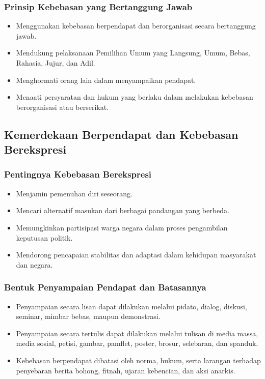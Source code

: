 \subsubsection{Prinsip Kebebasan yang Bertanggung Jawab}
\begin{itemize}
\item Menggunakan kebebasan berpendapat dan berorganisasi secara bertanggung jawab.
\item Mendukung pelaksanaan Pemilihan Umum yang Langsung, Umum, Bebas, Rahasia, Jujur, dan Adil.
\item Menghormati orang lain dalam menyampaikan pendapat.
\item Menaati persyaratan dan hukum yang berlaku dalam melakukan kebebasan berorganisasi atau berserikat.
\end{itemize}

\subsection{Kemerdekaan Berpendapat dan Kebebasan Berekspresi}

\subsubsection{Pentingnya Kebebasan Berekspresi}
\begin{itemize}
\item Menjamin pemenuhan diri seseorang.
\item Mencari alternatif masukan dari berbagai pandangan yang berbeda.
\item Memungkinkan partisipasi warga negara dalam proses pengambilan keputusan politik.
\item Mendorong pencapaian stabilitas dan adaptasi dalam kehidupan masyarakat dan negara.
\end{itemize}

\subsubsection{Bentuk Penyampaian Pendapat dan Batasannya}
\begin{itemize}
\item Penyampaian secara lisan dapat dilakukan melalui pidato, dialog, diskusi, seminar, mimbar bebas, maupun demonstrasi.
\item Penyampaian secara tertulis dapat dilakukan melalui tulisan di media massa, media sosial, petisi, gambar, pamflet, poster, brosur, selebaran, dan spanduk.
\item Kebebasan berpendapat dibatasi oleh norma, hukum, serta larangan terhadap penyebaran berita bohong, fitnah, ujaran kebencian, dan aksi anarkis.
\end{itemize}

